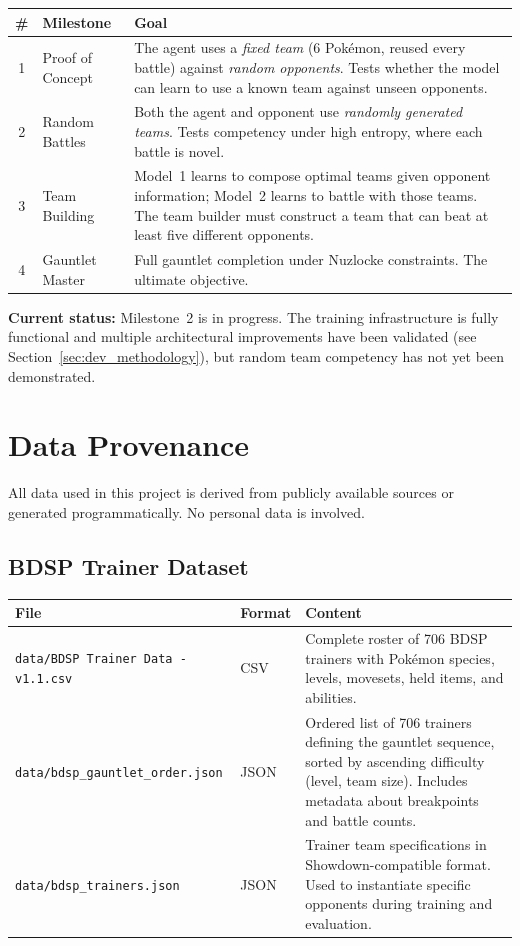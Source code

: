 \begin{center}
\small
\begin{tabularx}{\textwidth}{c l X}
  \toprule
  \textbf{\#} & \textbf{Milestone} & \textbf{Goal} \\
  \midrule
  1 & Proof of Concept &
    The agent uses a \emph{fixed team} (6 Pok\'{e}mon, reused every battle)
    against \emph{random opponents}.  Tests whether the model can learn to
    use a known team against unseen opponents. \\
  2 & Random Battles &
    Both the agent and opponent use \emph{randomly generated teams}.  Tests
    competency under high entropy, where each battle is novel. \\
  3 & Team Building &
    Model~1 learns to compose optimal teams given opponent information;
    Model~2 learns to battle with those teams.  The team builder must
    construct a team that can beat at least five different opponents. \\
  4 & Gauntlet Master &
    Full gauntlet completion under Nuzlocke constraints.  The ultimate
    objective. \\
  \bottomrule
\end{tabularx}
\end{center}

\textbf{Current status:} Milestone~2 is in progress.  The training
infrastructure is fully functional and multiple architectural improvements have
been validated (see Section~\ref{sec:dev_methodology}), but random team 
competency has not yet been demonstrated.

\section{Data Provenance}

All data used in this project is derived from publicly available sources or
generated programmatically.  No personal data is involved.

\subsection{BDSP Trainer Dataset}

\begin{center}
\small
\begin{tabularx}{\textwidth}{l l X}
  \toprule
  \textbf{File} & \textbf{Format} & \textbf{Content} \\
  \midrule
  \texttt{data/BDSP Trainer Data - v1.1.csv} & CSV &
    Complete roster of 706 BDSP trainers with Pok\'{e}mon species, levels,
    movesets, held items, and abilities. \\
  \texttt{data/bdsp\_gauntlet\_order.json} & JSON &
    Ordered list of 706 trainers defining the gauntlet sequence, sorted by
    ascending difficulty (level, team size).  Includes metadata about
    breakpoints and battle counts. \\
  \texttt{data/bdsp\_trainers.json} & JSON &
    Trainer team specifications in Showdown-compatible format.  Used to
    instantiate specific opponents during training and evaluation. \\
  \bottomrule
\end{tabularx}
\end{center}

